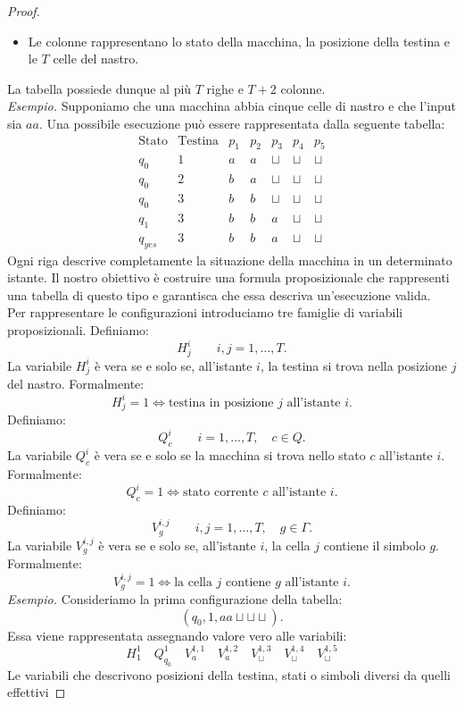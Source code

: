\begin{proof}
\begin{itemize}
    \item Le colonne rappresentano lo stato della
    macchina, la posizione della testina e le $T$
    celle del nastro.
\end{itemize}
La tabella possiede dunque al più $T$ righe e
$T+2$ colonne.\medskip\\
\textit{Esempio.}
Supponiamo che una macchina abbia cinque celle
di nastro e che l'input sia $aa$.
Una possibile esecuzione può essere rappresentata
dalla seguente tabella:
\[
\begin{array}{c|c|ccccc}
\text{Stato} & \text{Testina}
& p_1 & p_2 & p_3 & p_4 & p_5\\
\hline
q_0     & 1 & a & a & \sqcup & \sqcup & \sqcup\\
q_0     & 2 & b & a & \sqcup & \sqcup & \sqcup\\
q_0     & 3 & b & b & \sqcup & \sqcup & \sqcup\\
q_1     & 3 & b & b & a & \sqcup & \sqcup\\
q_{yes} & 3 & b & b & a & \sqcup & \sqcup
\end{array}
\]
Ogni riga descrive completamente la situazione
della macchina in un determinato istante.
Il nostro obiettivo è costruire una formula
proposizionale che rappresenti una tabella di
questo tipo e garantisca che essa descriva
un'esecuzione valida.\\
Per rappresentare le configurazioni introduciamo
tre famiglie di variabili proposizionali.
Definiamo:
\[
H_j^i
\qquad i,j=1,\ldots,T.
\]
La variabile $H_j^i$ è vera se e solo se,
all'istante $i$, la testina si trova nella
posizione $j$ del nastro.
Formalmente:
\[
H_j^i=1
\iff
\text{testina in posizione }j
\text{ all'istante }i.
\]
Definiamo:
\[
Q_c^i
\qquad i=1,\ldots,T,\quad c\in Q.
\]
La variabile $Q_c^i$ è vera se e solo se
la macchina si trova nello stato $c$
all'istante $i$.
Formalmente:
\[
Q_c^i=1
\iff
\text{stato corrente }c
\text{ all'istante }i.
\]
Definiamo:
\[
V_g^{i,j}
\qquad
i,j=1,\ldots,T,\quad g\in\Gamma.
\]
La variabile $V_g^{i,j}$ è vera se e solo se,
all'istante $i$, la cella $j$ contiene
il simbolo $g$.
Formalmente:
\[
V_g^{i,j}=1
\iff
\text{la cella }j\text{ contiene }g
\text{ all'istante }i.
\]
\textit{Esempio.}
Consideriamo la prima configurazione della tabella:
\[
(q_0,1,aa\sqcup\sqcup\sqcup).
\]
Essa viene rappresentata assegnando valore vero
alle variabili:
\[
H_1^1\quad Q_{q_0}^1\quad
V_a^{1,1}\quad V_a^{1,2} \quad
V_{\sqcup}^{1,3}\quad
V_{\sqcup}^{1,4}\quad
V_{\sqcup}^{1,5}
\]
Le variabili che descrivono posizioni della testina,
stati o simboli diversi da quelli effettivi

\end{proof}
